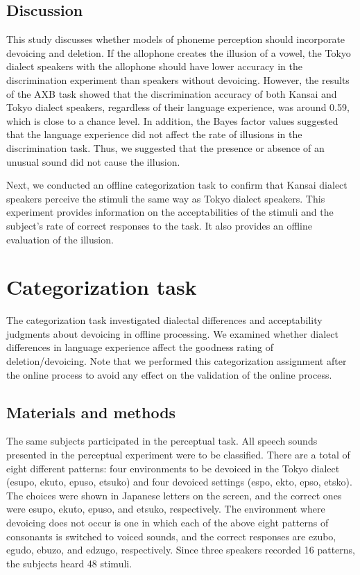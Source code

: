 \documentclass[a4paper,11pt,twocolumn]{article}
\begin{document}
\subsection{Discussion}

This study discusses whether models of phoneme perception should incorporate devoicing and deletion. If the allophone creates the illusion of a vowel, the Tokyo dialect speakers with the allophone should have lower accuracy in the discrimination experiment than speakers without devoicing. However, the results of the AXB task showed that the discrimination accuracy of both Kansai and Tokyo dialect speakers, regardless of their language experience, was around 0.59, which is close to a chance level. In addition, the Bayes factor values suggested that the language experience did not affect the rate of illusions in the discrimination task. Thus, we suggested that the presence or absence of an unusual sound did not cause the illusion.

Next, we conducted an offline categorization task to confirm that Kansai dialect speakers perceive the stimuli the same way as Tokyo dialect speakers. This experiment provides information on the acceptabilities of the stimuli and the subject's rate of correct responses to the task. It also provides an offline evaluation of the illusion.


\section{Categorization task}

The categorization task investigated dialectal differences and acceptability judgments about devoicing in offline processing. We examined whether dialect differences in language experience affect the goodness rating of deletion/devoicing. Note that we performed this categorization assignment after the online process to avoid any effect on the validation of the online process.

\subsection{Materials and methods}

The same subjects participated in the perceptual task. All speech sounds presented in the perceptual experiment were to be classified. There are a total of eight different patterns: four environments to be devoiced in the Tokyo dialect (esupo, ekuto, epuso, etsuko) and four devoiced settings (espo, ekto, epso, etsko). The choices were shown in Japanese letters on the screen, and the correct ones were esupo, ekuto, epuso, and etsuko, respectively. The environment where devoicing does not occur is one in which each of the above eight patterns of consonants is switched to voiced sounds, and the correct responses are ezubo, egudo, ebuzo, and edzugo, respectively. Since three speakers recorded 16 patterns, the subjects heard 48 stimuli.
\end{document}
